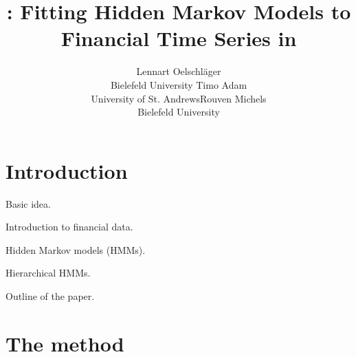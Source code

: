 \documentclass[article]{jss}
\author{Lennart Oelschl\"ager \\Bielefeld University \And Timo Adam \\University of St. Andrews\And Rouven Michels \\Bielefeld University}
\title{\pkg{fHMM}: Fitting Hidden Markov Models to Financial Time Series in \proglang{R}}
\newcommand{\fct}[1]{\code{#1()}}
\begin{document}



\section{Introduction}
\label{sec:intro}

Basic idea.

Introduction to financial data.

Hidden Markov models (HMMs).

Hierarchical HMMs.

Outline of the paper.





\section{The method} \label{sec:method}
\end{document}
